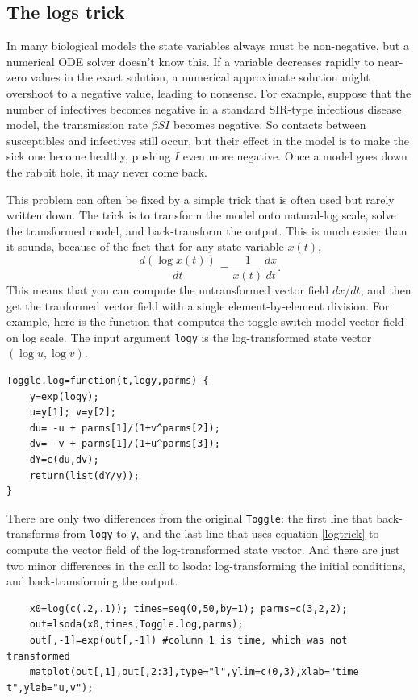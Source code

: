\documentclass [11pt]{article}
\newcommand{\blst}{\vspace{-0.035in} \begin{lstlisting}}
\newcommand{\ttt}[1]{\texttt{#1}}
\numberwithin{exercise}{section}
\begin{document}
\subsection{The logs trick}
In many biological models the state variables always must be non-negative, but 
a numerical ODE solver doesn't know this. If a variable decreases rapidly to near-zero 
values in the exact solution, a numerical approximate solution might overshoot to a 
negative value, leading to nonsense. For example, suppose that the number of infectives becomes
negative in a standard SIR-type infectious disease model, the transmission rate $\beta SI$ becomes 
negative. So contacts between susceptibles and infectives still occur, but their effect in the 
model is to make the sick one become healthy, pushing $I$ even more negative. Once a model goes
down the rabbit hole, it may never come back.  
  
This problem can often be fixed by a simple trick that is 
often used but rarely written down. The trick is to 
transform the model onto natural-log scale, solve the transformed model, and back-transform 
the output. This is much easier than it sounds, because of the fact that for any state variable
$x(t)$,  
\begin{equation}
\frac{d(\log x(t))}{dt} = \frac{1}{x(t)}\frac{dx}{dt}. 
\label{logtrick}
\end{equation}
This means that you can compute the untransformed vector field $dx/dt$, and then get
the tranformed vector field with a single element-by-element division. 
For example, here is the function that computes the toggle-switch model vector field 
on log scale. The input argument \ttt{logy} is the log-transformed state vector $(\log u, \log v)$.   
\blst
Toggle.log=function(t,logy,parms) {
	y=exp(logy); 
	u=y[1]; v=y[2];
	du= -u + parms[1]/(1+v^parms[2]);
	dv= -v + parms[1]/(1+u^parms[3]);
	dY=c(du,dv); 
	return(list(dY/y)); 
}
\end{lstlisting} 
There are only two differences from the original \ttt{Toggle}: the first line that
back-transforms from \ttt{logy} to \ttt{y}, and the last line that uses equation
\eqref{logtrick} to compute the vector field of the log-transformed state vector.  
And there are just two minor differences in the call to lsoda: log-transforming
the initial conditions, and back-transforming the output. 
\blst
    x0=log(c(.2,.1)); times=seq(0,50,by=1); parms=c(3,2,2);
    out=lsoda(x0,times,Toggle.log,parms);
    out[,-1]=exp(out[,-1]) #column 1 is time, which was not transformed 
    matplot(out[,1],out[,2:3],type="l",ylim=c(0,3),xlab="time t",ylab="u,v"); 
\end{lstlisting}
\end{document}
